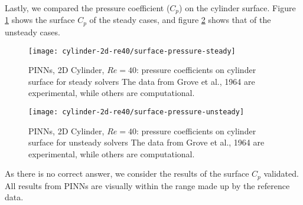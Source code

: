 Lastly, we compared the pressure coefficient ($C_p$) on the cylinder surface.
Figure \ref{fig:cylinder-2d-re40-surface-cp-steady} shows the surface $C_p$ of the steady cases, and figure \ref{fig:cylinder-2d-re40-surface-cp-unsteady} shows that of the unsteady cases.
\begin{figure}[hbt!]
    \texttt{[image: cylinder-2d-re40/surface-pressure-steady]}
    \caption[
        PINNs, 2D Cylinder, $Re=40$: pressure coefficients on cylinder surface for steady solvers%
    ]{
        PINNs, 2D Cylinder, $Re=40$: pressure coefficients on cylinder surface for steady solvers%
        The data from Grove et al., 1964 are experimental, while others are computational.
    }%
    \label{fig:cylinder-2d-re40-surface-cp-steady}
\end{figure}
\begin{figure}[hbt!]
    \texttt{[image: cylinder-2d-re40/surface-pressure-unsteady]}
    \caption[
        PINNs, 2D Cylinder, $Re=40$: pressure coefficients on cylinder surface for unsteady solvers%
    ]{
        PINNs, 2D Cylinder, $Re=40$: pressure coefficients on cylinder surface for unsteady solvers%
        The data from Grove et al., 1964 are experimental, while others are computational.
    }%
    \label{fig:cylinder-2d-re40-surface-cp-unsteady}
\end{figure}
As there is no correct answer, we consider the results of the surface $C_p$ validated.
All results from PINNs are visually within the range made up by the reference data.
